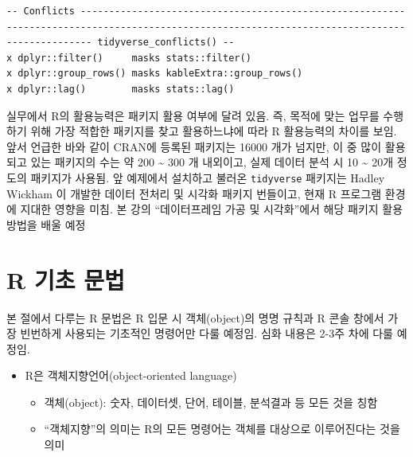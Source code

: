\documentclass[
  11pt,
]{krantz}
\providecommand{\tightlist}{%
  \setlength{\itemsep}{0pt}\setlength{\parskip}{0pt}}
\let\BeginKnitrBlock\begin \let\EndKnitrBlock\end
\begin{document}
\begin{verbatim}
-- Conflicts ---------------------------------------------------------------------------------------------------------------------------------------------- tidyverse_conflicts() --
x dplyr::filter()     masks stats::filter()
x dplyr::group_rows() masks kableExtra::group_rows()
x dplyr::lag()        masks stats::lag()
\end{verbatim}

\normalsize

\footnotesize

\BeginKnitrBlock{rmdnote}
실무에서 R의 활용능력은 패키지 활용 여부에 달려 있음. 즉, 목적에 맞는 업무를 수행하기 위해 가장 적합한 패키지를 찾고 활용하느냐에 따라 R 활용능력의 차이를 보임. 앞서 언급한 바와 같이 CRAN에 등록된 패키지는 16000 개가 넘지만, 이 중 많이 활용되고 있는 패키지의 수는 약 200 \textasciitilde{} 300 개 내외이고, 실제 데이터 분석 시 10 \textasciitilde{} 20개 정도의 패키지가 사용됨. 앞 예제에서 설치하고 불러온 \texttt{tidyverse} 패키지는 Hadley Wickham \citep{tidyverse2019}이 개발한 데이터 전처리 및 시각화 패키지 번들이고, 현재 R 프로그램 환경에 지대한 영향을 미침. 본 강의 ``데이터프레임 가공 및 시각화''에서 해당 패키지 활용 방법을 배울 예정
\EndKnitrBlock{rmdnote}

\normalsize

\hypertarget{r-basic}{%
\section{R 기초 문법}\label{r-basic}}

\footnotesize

\BeginKnitrBlock{rmdnote}
본 절에서 다루는 R 문법은 R 입문 시 객체(object)의 명명 규칙과 R 콘솔 창에서 가장 빈번하게 사용되는 기초적인 명령어만 다룰 예정임. 심화 내용은 2-3주 차에 다룰 예정임.
\EndKnitrBlock{rmdnote}

\normalsize

\begin{itemize}
\tightlist
\item
  R은 객체지향언어(object-oriented language)

  \begin{itemize}
  \tightlist
  \item
    객체(object): 숫자, 데이터셋, 단어, 테이블, 분석결과 등 모든 것을 칭함
  \item
    ``객체지향''의 의미는 R의 모든 명령어는 객체를 대상으로 이루어진다는 것을 의미
  \end{itemize}
\end{itemize}
\end{document}
